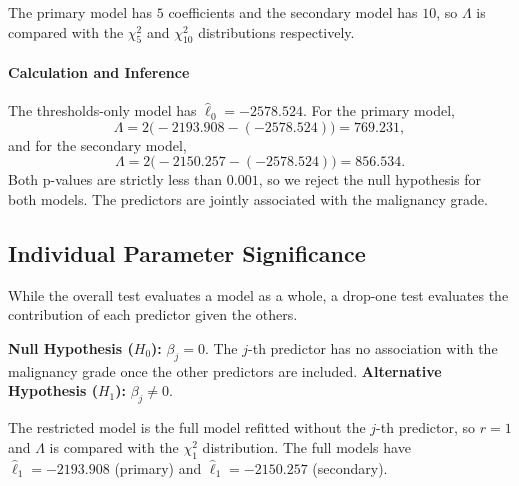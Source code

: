 \documentclass[12pt]{article}
\begin{document}
The primary model has $5$ coefficients and the secondary model has $10$,
so $\Lambda$ is compared with the $\chi^2_5$ and $\chi^2_{10}$ distributions
respectively.

\paragraph{Calculation and Inference}
The thresholds-only model has $\hat{\ell}_0 = -2578.524$. For the primary
model,
\[
  \Lambda = 2\bigl(-2193.908 - (-2578.524)\bigr) = 769.231,
\]
and for the secondary model,
\[
  \Lambda = 2\bigl(-2150.257 - (-2578.524)\bigr) = 856.534.
\]
Both p-values are strictly less than $0.001$, so we reject the null
hypothesis for both models. The predictors are jointly associated with the
malignancy grade.

\subsection{Individual Parameter Significance}

While the overall test evaluates a model as a whole, a drop-one test
evaluates the contribution of each predictor given the others.

\begin{itemize}
    \ii \textbf{Null Hypothesis ($H_0$):} $\beta_j = 0$. The $j$-th
    predictor has no association with the malignancy grade once the other
    predictors are included.
    \ii \textbf{Alternative Hypothesis ($H_1$):} $\beta_j \neq 0$.
\end{itemize}

The restricted model is the full model refitted without the $j$-th
predictor, so $r = 1$ and $\Lambda$ is compared with the $\chi^2_1$
distribution. The full models have $\hat{\ell}_1 = -2193.908$ (primary) and
$\hat{\ell}_1 = -2150.257$ (secondary).
\end{document}
